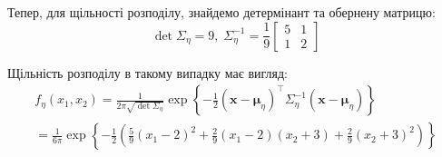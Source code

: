 \documentclass{hw_template}
\begin{document}
Тепер, для щільності розподілу, знайдемо детермінант та обернену матрицю:
\begin{equation*}
    \det \Sigma_{\eta} = 9, \; \Sigma_{\eta}^{-1} = \frac{1}{9}\begin{bmatrix}
        5 & 1 \\ 1 & 2
    \end{bmatrix}
\end{equation*}

Щільність розподілу в такому випадку має вигляд:
\begin{align*}
    f_{\eta}(x_1,x_2) = \frac{1}{2\pi\sqrt{\det \Sigma_{\eta}}} \exp\left\{-\frac{1}{2}(\boldsymbol{x}-\boldsymbol{\mu}_{\eta})^{\top}\Sigma_{\eta}^{-1}(\boldsymbol{x}-\boldsymbol{\mu}_{\eta})\right\} \\
    = \frac{1}{6\pi}\exp\left\{ -\frac{1}{2}\left( \frac{5}{9}(x_1-2)^2 + \frac{2}{9}(x_1-2)(x_2+3) + \frac{2}{9}(x_2+3)^2 \right) \right\}
\end{align*}
\end{document}
